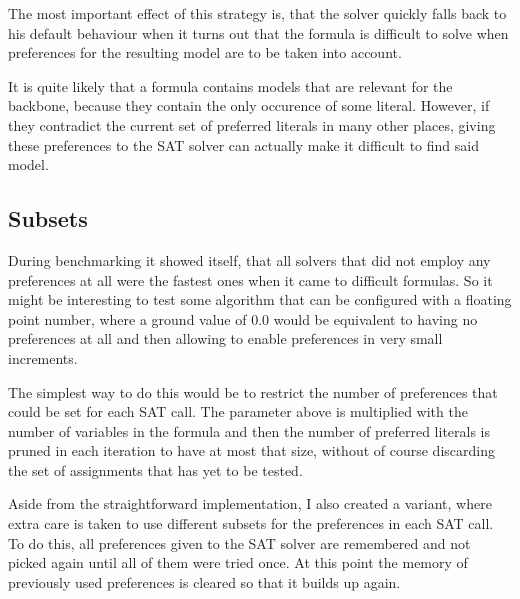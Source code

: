 The most important effect of this strategy is, that the solver quickly falls back to his default behaviour when it turns out that the formula is difficult to solve when preferences for the resulting model are to be taken into account. 

It is quite likely that a formula contains models that are relevant for the backbone, because they contain the only occurence of some literal. However, if they contradict the current set of preferred literals in many other places, giving these preferences to the SAT solver can actually make it difficult to find said model.

\subsection{Subsets}
\label{sec:subsets}
During benchmarking it showed itself, that all solvers that did not employ any preferences at all were the fastest ones when it came to difficult formulas. So it might be interesting to test some algorithm that can be configured with a floating point number, where a ground value of $0.0$ would be equivalent to having no preferences at all and then allowing to enable preferences in very small increments.

The simplest way to do this would be to restrict the number of preferences that could be set for each SAT call. The parameter above is multiplied with the number of variables in the formula and then the number of preferred literals is pruned in each iteration to have at most that size, without of course discarding the set of assignments that has yet to be tested.

Aside from the straightforward implementation, I also created a variant, where extra care is taken to use different subsets for the preferences in each SAT call. To do this, all preferences given to the SAT solver are remembered and not picked again until all of them were tried once. At this point the memory of previously used preferences is cleared so that it builds up again.





